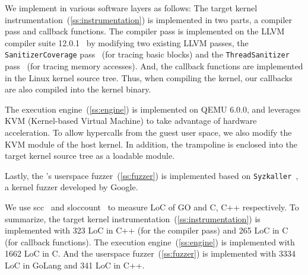 We implement \sys in various software layers as follows:
%
The target kernel instrumentation~(\autoref{ss:instrumentation}) is
implemented in two parts, a compiler pass and callback functions. The
compiler pass is implemented on the LLVM compiler suite
12.0.1~\cite{llvm} by modifying two existing LLVM passes, the
\texttt{SanitizerCoverage} pass~\cite{kcovpass} (for tracing basic
blocks) and the \texttt{ThreadSanitizer} pass~\cite{tsanpass} (for
tracing memory accesses).
%
And, the callback functions are implemented in the Linux kernel source
tree.
%
Thus, when compiling the kernel, our callbacks are also compiled into
the kernel binary.


The execution engine~(\autoref{ss:engine}) is implemented on QEMU
6.0.0, and leverages KVM (Kernel-based Virtual Machine) to take
advantage of hardware acceleration.
%
To allow hypercalls from the guest user space, we also modify the KVM
module of the host kernel.
%
In addition, the trampoline is enclosed into the target kernel source
tree as a loadable module.


Lastly, the \sys's userspace fuzzer~(\autoref{ss:fuzzer}) is
implemented based on \texttt{Syzkaller}~\cite{syzkaller}, a kernel
fuzzer developed by Google.



%
We use scc~\cite{scc} and sloccount~\cite{sloccount} to measure LoC of
GO and C, C++ respectively.
%
To summarize, the target kernel
instrumentation~(\autoref{ss:instrumentation}) is implemented with 323
LoC in C++ (for the compiler pass) and 265 LoC in C (for callback
functions).
%
The execution engine~(\autoref{ss:engine}) is implemented with 1662
LoC in C. And the userspace fuzzer~(\autoref{ss:fuzzer}) is
implemented with 3334 LoC in GoLang and 341 LoC in C++.








